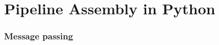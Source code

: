 
\chapter{Pipeline Assembly in Python}
\label{chap:pipeline}
\subsection{Message passing}
\subsubsection{}

